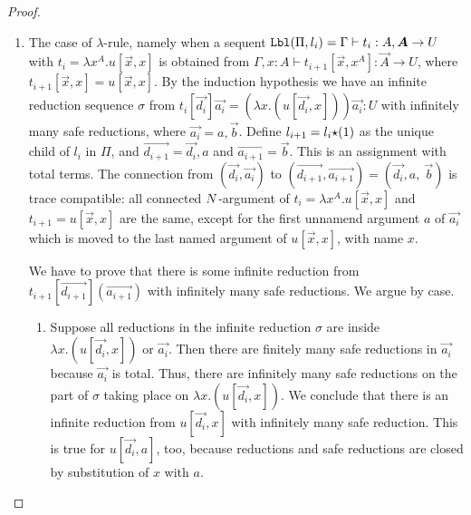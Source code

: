 \begin{proof}
\begin{enumerate}

\item
  The case of $\lambda$-rule, namely when a sequent
  $\Label(\Pi,l_i) = 
    \Gamma\vdash t_i : A, \vec{A} \rightarrow U$ with $t_i = \lambda x^A.u[\vec{x},x]$
  is obtained from
  $\Gamma,x:A\vdash t_{i+1}[\vec{x},x^A]:\vec{A}\rightarrow U$, 
  where $t_{i+1}[\vec{x},x]=u[\vec{x},x]$.
  By the induction hypothesis we have an infinite reduction sequence $\sigma$ from
  $t_i[\vec{d_i}]\vec{a_i} = (\lambda x.(u[\vec{d_i},x]))\vec{a_i}: U$ with infinitely many safe
  reductions,
  where $\vec{a_i} = a,\vec{b}$. 
  Define $l_{i+1}=l_i{\star}(1)$ as the unique child of $l_i$ in $\Pi$,
  and $\vec{d_{i+1}} = \vec{d_i},a$ and $\vec{a_{i+1}} = \vec{b}$. 
  This is an assignment with total terms.
    The connection from 
  $(\vec{d_i},\vec{a_i})$ to $(\vec{d_{i+1}},\vec{a_{i+1}}) = (\vec{d_i},a, \ \vec{b})$ is
  trace compatible: all connected ${N}$-argument of 
  $t_{i}=\lambda x^A.u[\vec{x},x]$ and $t_{i+1}=u[\vec{x},x]$ are 
  the same, except for the first unnamend argument $a$ of $\vec{a_i}$ which is moved to
  the last named argument of $u[\vec{x},x]$, with name $x$.
  
  We have to prove that there is some infinite reduction from 
  $t_{i+1}[\vec{d_{i+1}}](\vec{a_{i+1}})$ with infinitely
  many safe reductions. We argue by case.

\begin{enumerate}
\item
 Suppose all reductions in the infinite reduction $\sigma$ 
  are inside $\lambda x.(u[\vec{d_i},x])$ or $\vec{a_i}$.
 Then there are finitely many safe reductions in $\vec{a_i}$ because $\vec{a_i}$ is total.
 Thus, there are infinitely many safe reductions on the part of $\sigma$
  taking place on $\lambda x.(u[\vec{d_i},x])$.
  We conclude that there is an infinite reduction from $u[\vec{d_i},x]$ with infinitely many safe reduction.
  This is true for $u[\vec{d_i},a]$, too, because reductions and safe reductions are closed by substitution
  of $x$ with $a$.


\end{enumerate}
\end{enumerate}
\end{proof}
